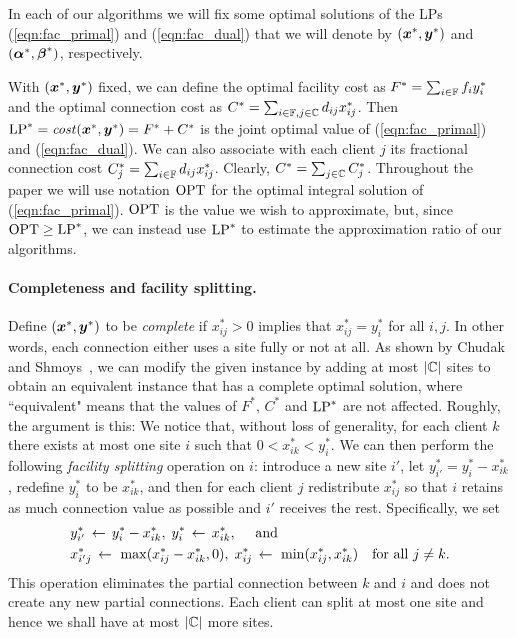 \documentclass[11pt]{article}
\begin{document}
In each of our algorithms we will fix some optimal
solutions of the LPs (\ref{eqn:fac_primal}) and (\ref{eqn:fac_dual})
that we will denote by $(\boldsymbol{x}^\ast, \boldsymbol{y}^\ast)$ and
$(\boldsymbol{\alpha}^\ast,\boldsymbol{\beta}^\ast)$, respectively.

With $(\boldsymbol{x}^\ast, \boldsymbol{y}^\ast)$ fixed, we can define the
optimal facility cost as $F^\ast=\sum_{i\in\mathbb{F}} f_i
y_i^\ast$ and the optimal connection cost as $C^\ast =
\sum_{i\in\mathbb{F},j\in\mathbb{C}} d_{ij}x_{ij}^\ast$.
Then $\mbox{\rm LP}^\ast = {\it cost}(\boldsymbol{x}^\ast,\boldsymbol{y}^\ast) = F^\ast+C^\ast$
is the joint optimal value of (\ref{eqn:fac_primal}) and
(\ref{eqn:fac_dual}).  We can also associate with each
client $j$ its fractional connection cost $C^\ast_j =
\sum_{i\in\mathbb{F}} d_{ij}x_{ij}^\ast$.  Clearly, $C^\ast =
\sum_{j\in\mathbb{C}} C^\ast_j$.  Throughout the paper we
will use notation $\mbox{\rm OPT}$ for the optimal integral solution
of (\ref{eqn:fac_primal}).  $\mbox{\rm OPT}$ is the value we wish to
approximate, but, since $\mbox{\rm OPT}\ge\mbox{\rm LP}^\ast$, we can instead use
$\mbox{\rm LP}^\ast$ to estimate the approximation ratio of our
algorithms.


\paragraph{Completeness and facility splitting.}
Define $(\boldsymbol{x}^\ast, \boldsymbol{y}^\ast)$ to be \emph{complete} if
$x_{ij}^\ast>0$ implies that $x_{ij}^\ast=y_i^\ast$ for all
$i,j$. In other words, each connection either uses a site
fully or not at all.  As shown by Chudak and
Shmoys~\cite{ChudakS04}, we can modify the given instance by
adding at most $|\mathbb{C}|$ sites to obtain an equivalent
instance that has a complete optimal solution, where
``equivalent" means that the values of $F^\ast$, $C^\ast$ and
$\mbox{\rm LP}^\ast$ are not affected. Roughly, the
argument is this: We notice that, without loss of
generality, for each client $k$ there exists at most one
site $i$ such that $0 < x_{ik}^\ast < y_i^\ast$.  We can
then perform the following \emph{facility splitting}
operation on $i$: introduce a new site $i'$, let
$y^\ast_{i'} = y^\ast_i - x^\ast_{ik}$, redefine $y^\ast_i$
to be $x^\ast_{ik}$, and then for each client $j$
redistribute $x^\ast_{ij}$ so that $i$ retains as much
connection value as possible and $i'$ receives the
rest. Specifically, we set
%
\begin{align*}
  &y^\ast_{i'} \;{\,\leftarrow\,}\; y^\ast_i - x^\ast_{ik},\;   y^\ast_{i} \;{\,\leftarrow\,}\; x^\ast_{ik}, \quad \text{ and }\\
  &x^\ast_{i'j} \;{\,\leftarrow\,}\;\max( x^\ast_{ij} - x^\ast_{ik}, 0 ),\;	 x^\ast_{ij} \;{\,\leftarrow\,}\; \min( x^\ast_{ij} , x^\ast_{ik}) 
			\quad	\textrm{for all}\ j \neq k.
\end{align*}
%
This operation eliminates the partial connection between $k$
and $i$ and does not create any new partial
connections. Each client can split at most one site and
hence we shall have at most $|\mathbb{C}|$ more sites.
\end{document}
